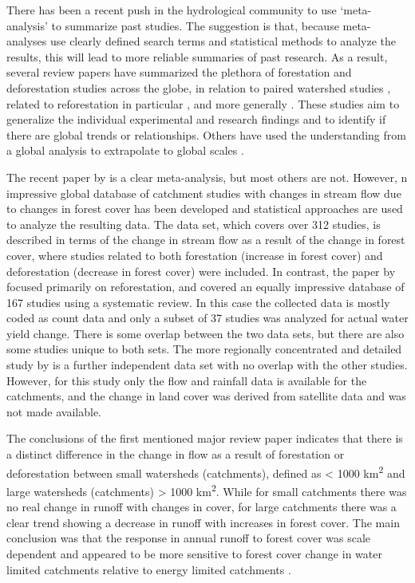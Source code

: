 \documentclass[]{elsarticle} %
\begin{document}
There has been a recent push in the hydrological community \citep{evaristo2020metaanalysis} to use `meta-analysis' to summarize past studies. The suggestion is that, because meta-analyses use clearly defined search terms and statistical methods to analyze the results, this will lead to more reliable summaries of past research. As a result, several review papers have summarized the plethora of forestation and deforestation studies across the globe, in relation to paired watershed studies \citep{brown2005, hewlett1984}, related to reforestation in particular \citep{filoso2017}, and more generally \citep{jackson2005, zhang2017}. These studies aim to generalize the individual experimental and research findings and to identify if there are global trends or relationships. Others have used the understanding from a global analysis to extrapolate to global scales \citep{hoekvandijke2022}.

The recent paper by \citet{filoso2017} is a clear meta-analysis, but most others \citep{zhang2017, hoekvandijke2022, zhou2015} are not. However, n impressive global database of catchment studies with changes in stream flow due to changes in forest cover has been developed \citep{zhang2017, filoso2017} and statistical approaches are used to analyze the resulting data. The \citet{zhang2017} data set, which covers over 312 studies, is described in terms of the change in stream flow as a result of the change in forest cover, where studies related to both forestation (increase in forest cover) and deforestation (decrease in forest cover) were included. In contrast, the paper by \citet{filoso2017} focused primarily on reforestation, and covered an equally impressive database of 167 studies using a systematic review. In this case the collected data is mostly coded as count data and only a subset of 37 studies was analyzed for actual water yield change. There is some overlap between the two data sets, but there are also some studies unique to both sets. The more regionally concentrated and detailed study by \citet{levy2018} is a further independent data set with no overlap with the other studies. However, for this study only the flow and rainfall data is available for the catchments, and the change in land cover was derived from satellite data and was not made available.

The conclusions of the first mentioned major review paper \citep{zhang2017} indicates that there is a distinct difference in the change in flow as a result of forestation or deforestation between small watersheds (catchments), defined as \textless{} 1000 km\textsuperscript{2} and large watersheds (catchments) \textgreater{} 1000 km\textsuperscript{2}. While for small catchments there was no real change in runoff with changes in cover, for large catchments there was a clear trend showing a decrease in runoff with increases in forest cover. The main conclusion was that the response in annual runoff to forest cover was scale dependent and appeared to be more sensitive to forest cover change in water limited catchments relative to energy limited catchments \citep{zhang2017}.
\end{document}
